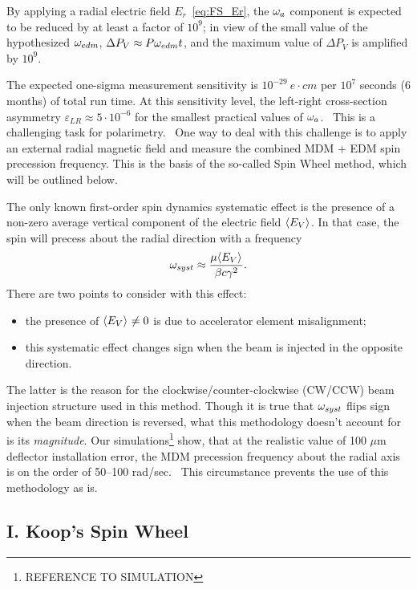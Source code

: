 \documentclass{article}
\begin{document}
By applying a radial electric field $E_r$~\eqref{eq:FS_Er}, the $\omega_a$ component is expected to be reduced by at least a factor of $10^9$; in view of the small value of the hypothesized $\omega_{edm}$, $\Delta P_V \approx P \omega_{edm} t$, and the maximum value of $\Delta P_V$ is amplified by $10^9$.

The expected one-sigma measurement sensitivity is $10^{-29}~e\cdot cm$ per $10^7$ seconds (6 months) of total run time. At this sensitivity level, the left-right cross-section asymmetry $\varepsilon_{LR} \approx 5\cdot 10^{-6}$ for the smallest practical values of $\omega_a$.~\citep[p.~18]{BNL:Deuteron2008} This is a challenging task for polarimetry.~\cite{Mane:SpinWheel} One way to deal with this challenge is to apply an external radial magnetic field and measure the combined MDM + EDM spin precession frequency. This is the basis of the so-called Spin Wheel method, which will be outlined below.

The only known first-order spin dynamics systematic effect is the presence of a non-zero average vertical component of the electric field $\avg{E_V}$. In that case, the spin will precess about the radial direction with a frequency~\citep[p.~11]{BNL:Deuteron2008}
\[
\w_{syst} \approx \frac{\mu\avg{E_V}}{\beta c\gamma^2}.
\]
There are two points to consider with this effect:
\begin{itemize}
\item the presence of $\avg{E_V}\neq 0$ is due to accelerator element misalignment;
\item this systematic effect changes sign when the beam is injected in the opposite direction.
\end{itemize}
The latter is the reason for the clockwise/counter-clockwise (CW/CCW) beam injection structure used in this method. Though it is true that $\omega_{syst}$ flips sign when the beam direction is reversed, what this methodology doesn't account for is its \emph{magnitude}. Our simulations\footnote{REFERENCE TO SIMULATION} show, that at the realistic value of 100 $\mu$m deflector installation error, the MDM precession frequency about the radial axis is on the order of 50--100 rad/sec.~\cite{Senichev:FDM} This circumstance prevents the use of this methodology as is.


\subsection{I. Koop's Spin Wheel}
\end{document}

